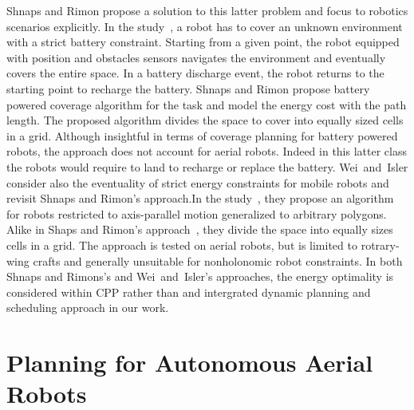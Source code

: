 Shnaps and Rimon propose a solution to this latter problem and focus to robotics scenarios explicitly. In the study~\citep{shnaps2016online}, a robot has to cover an unknown environment with a strict battery constraint. Starting from a given point, the robot equipped with position and obstacles sensors navigates the environment and eventually covers the entire space. In a battery discharge event, the robot returns to the starting point to recharge the battery. Shnaps and Rimon propose battery powered coverage algorithm for the task and model the energy cost with the path length. The proposed algorithm divides the space to cover into equally sized cells in a grid. Although insightful in terms of coverage planning for battery powered robots, the approach does not account for aerial robots. Indeed in this latter class the robots would require to land to recharge or replace the battery. Wei~and~Isler consider also the eventuality of strict energy constraints for mobile robots and revisit Shnaps and Rimon's approach.In the study~\citep{wei2018coverage}, they propose an algorithm for robots restricted to axis-parallel motion generalized to arbitrary polygons. Alike in Shaps and Rimon's approach~\citep{shnaps2016online}, they divide the space into equally sizes cells in a grid. The approach is tested on aerial robots, but is limited to rotrary-wing crafts and generally unsuitable for nonholonomic robot constraints. In both Shnaps and Rimons's and Wei~and~Isler's approaches, the energy optimality is considered within CPP rather than and intergrated dynamic planning and scheduling approach in our work.

\section{\color{orange}Planning for Autonomous Aerial Robots}
\label{sec:soa-aerial-pl}

